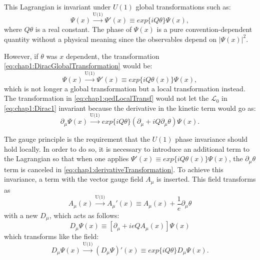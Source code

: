 This Lagrangian is invariant under $U(1)$ global transformations such as:
\begin{equation}\label{eq:chap1:DiracGlobalTransformation}
\Psi(x) \xrightarrow{\text{U(1)}} \Psi'(x) \equiv exp\{ i Q \theta \} \Psi(x),
\end{equation}
where $Q \theta$ is a real constant. The phase of $\Psi(x)$ is a pure convention-dependent quantity without a physical meaning since  the observables depend on $|\Psi(x)|^{2}$.


However, if $\theta$ was $x$ dependent, the transformation \ref{eq:chap1:DiracGlobalTransformation} would be:
\begin{equation}\label{eq:chap1:qedLocalTransf}
\Psi(x) \xrightarrow{\text{U(1)}} \Psi'(x) \equiv exp\{ i Q \theta (x) \} \Psi(x),
\end{equation}
which is not longer a global transformation but a local
transformation instead. The transformation in \ref{eq:chap1:qedLocalTransf} would not let the $\mathcal{L}_{0}$ in \ref{eq:chap1:Dirac1} 
invariant because the derivative in the kinetic term would go as:
\begin{equation}\label{eq:chap1:derivativeTransformation}
\partial_{\mu}\Psi(x) \xrightarrow{\text{U(1)}} exp\{ i Q \theta \} (\partial_{\mu} + iQ\partial_{\mu}\theta)\Psi(x).
\end{equation}

The gauge principle is the requirement that the $U(1)$ phase invariance should hold locally.
In order to do so, it is necessary to introduce an additional term to the Lagrangian so that when one applies $\Psi'(x) \equiv exp\{ i Q \theta (x) \} \Psi(x)$, 
the $\partial_{\mu}\theta$ term is canceled in \ref{eq:chap1:derivativeTransformation}.
To achieve this invariance, a term with the vector gauge field $A_{\mu}$ is inserted. This field transforms as
\begin{equation}\label{eq:chap1:AmuTransformation}
A_{\mu}(x) \xrightarrow{\text{U(1)}} A_{\mu}'(x) \equiv A_{\mu}(x)+\frac{1}{e}\partial_{\mu}\theta
\end{equation}
with a new $D_{\mu}$, which acts as follows:  %
\begin{equation}\label{eq:chap1:NewQEDderivative}
D_{\mu} \Psi(x) \equiv [ \partial_{\mu} + ieQA_{\mu}(x)]\Psi(x)
\end{equation}
which transforms like the field:
\begin{equation*}\label{eq:chap1:QED_DerivativeTransformation}
D_{\mu} \Psi(x) \xrightarrow{\text{U(1)}} (D_{\mu} \Psi)'(x) \equiv  exp\{ i Q \theta \} D_{\mu}\Psi(x).
\end{equation*}


